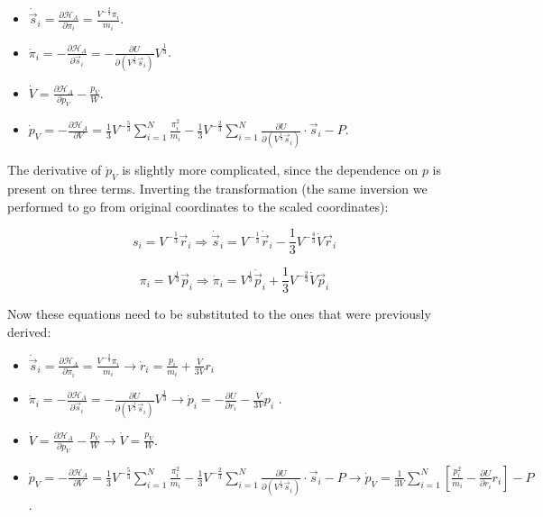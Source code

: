 \begin{itemize}
	\item $\dot{\vec{s}}_i = \frac{\partial \mathcal{H}_A}{\partial\pi_i} = \frac{V^{-\frac{2}{3}}\pi_i}{m_i}$.
	\item $\dot{\pi}_i = -\frac{\partial\mathcal{H}_A}{\partial\vec{s}_i} = -\frac{\partial U}{\partial (V^{\frac{1}{3}}\vec{s}_i)}V^{\frac{1}{3}}$.
	\item $\dot{V} = \frac{\partial\mathcal{H}_A}{\partial p_V}-\frac{p_V}{W}$.
	\item $\dot{p}_V = -\frac{\partial\mathcal{H}_A}{\partial V} = \frac{1}{3}V^{-\frac{5}{3}}\sum\limits_{i=1}^N\frac{\pi_i^2}{m_i}-\frac{1}{3}V^{-\frac{2}{3}}\sum\limits_{i=1}^N\frac{\partial U}{\partial(V^{\frac{1}{3}}\vec{s}_i)}\cdot\vec{s}_i-P$.
\end{itemize}

The derivative of $\dot{p}_V$ is slightly more complicated, since the dependence on $p$ is present on three terms.
Inverting the transformation (the same inversion we performed to go from original coordinates to the scaled coordinates):

$$s_i = V^{-\frac{1}{3}}\vec{r}_i\Rightarrow \dot{\vec{s}}_i = V^{-\frac{1}{3}}\dot{\vec{r}}_i-\frac{1}{3}V^{-\frac{4}{3}}\dot{V}\vec{r}_i$$

$$\pi_i = V^{\frac{1}{3}}\vec{p}_i \Rightarrow \dot{\pi}_i = V^{\frac{1}{3}}\dot{\vec{p}}_i + \frac{1}{3}V^{-\frac{2}{3}}\dot{V}\vec{p}_i$$

Now these equations need to be substituted to the ones that were previously derived:

\begin{itemize}
	\item $\dot{\vec{s}}_i = \frac{\partial \mathcal{H}_A}{\partial\pi_i} = \frac{V^{-\frac{2}{3}}\pi_i}{m_i} \rightarrow \dot{r}_i = \frac{p_i}{m_i} + \frac{\dot{V}}{3V} r_i$
	\item $\dot{\pi}_i = -\frac{\partial\mathcal{H}_A}{\partial\vec{s}_i} = -\frac{\partial U}{\partial (V^{\frac{1}{3}}\vec{s}_i)}V^{\frac{1}{3}} \rightarrow \dot{p}_i = - \frac{\partial U}{\partial r_i} - \frac{\dot{V} }{3V} p_i$ .
	\item $\dot{V} = \frac{\partial\mathcal{H}_A}{\partial p_V}-\frac{p_V}{W} \rightarrow \dot{V} = \frac{p_V}{W}$.
	\item $\dot{p}_V = -\frac{\partial\mathcal{H}_A}{\partial V} = \frac{1}{3}V^{-\frac{5}{3}}\sum\limits_{i=1}^N\frac{\pi_i^2}{m_i}-\frac{1}{3}V^{-\frac{2}{3}}\sum\limits_{i=1}^N\frac{\partial U}{\partial(V^{\frac{1}{3}}\vec{s}_i)}\cdot\vec{s}_i-P \rightarrow \dot{p}_V = \frac{1}{3V} \sum^N_{i=1} [\frac{p^2_i}{m_i} - \frac{\partial U}{\partial r_i} r_i] -P$.
\end{itemize}


